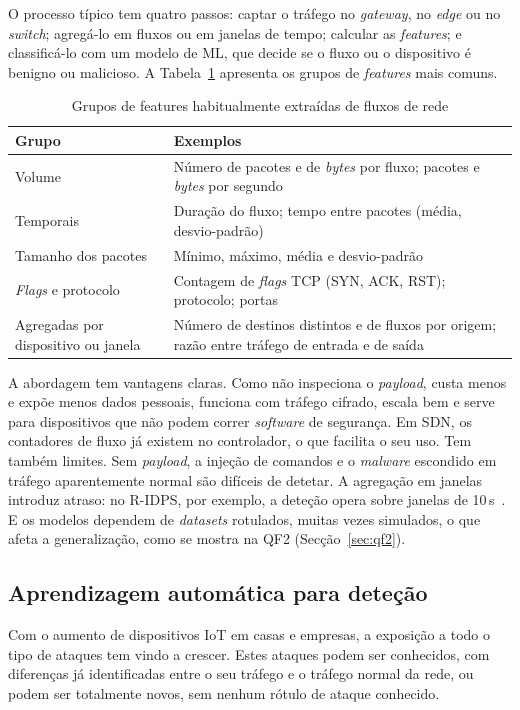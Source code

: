 \documentclass[conference,a4paper]{IEEEtran}
\begin{document}
O processo típico tem quatro passos: captar o tráfego no \textit{gateway}, no
\textit{edge} ou no \textit{switch}; agregá-lo em fluxos ou em janelas de tempo; calcular
as \textit{features}; e classificá-lo com um modelo de ML, que decide se o fluxo ou o
dispositivo é benigno ou malicioso. A Tabela~\ref{tab:features} apresenta os grupos de
\textit{features} mais comuns.

\begin{table}[H]
\caption{Grupos de features habitualmente extraídas de fluxos de rede}\label{tab:features}
\centering\scriptsize
\begin{tabular}{@{}>{\raggedright\arraybackslash}p{}>{\raggedright\arraybackslash}p{}@{}}
\toprule
Grupo & Exemplos \\
\midrule
Volume & Número de pacotes e de \textit{bytes} por fluxo; pacotes e \textit{bytes} por segundo \\
Temporais & Duração do fluxo; tempo entre pacotes (média, desvio-padrão) \\
Tamanho dos pacotes & Mínimo, máximo, média e desvio-padrão \\
\textit{Flags} e protocolo & Contagem de \textit{flags} TCP (SYN, ACK, RST); protocolo; portas \\
Agregadas por dispositivo ou janela & Número de destinos distintos e de fluxos por origem; razão entre tráfego de entrada e de saída \\
\bottomrule
\end{tabular}
\end{table}

A abordagem tem vantagens claras. Como não inspeciona o \textit{payload}, custa menos e
expõe menos dados pessoais, funciona com tráfego cifrado, escala bem e serve para
dispositivos que não podem correr \textit{software} de segurança. Em SDN, os contadores de
fluxo já existem no controlador, o que facilita o seu uso. Tem também limites. Sem
\textit{payload}, a injeção de comandos e o \textit{malware} escondido em tráfego
aparentemente normal são difíceis de detetar. A agregação em janelas introduz atraso: no
R-IDPS, por exemplo, a deteção opera sobre janelas de 10\,s~\cite{mazhar2022ridps}. E os
modelos dependem de \textit{datasets} rotulados, muitas vezes simulados, o que afeta a
generalização, como se mostra na QF2 (Secção~\ref{sec:qf2}).

\subsection{Aprendizagem automática para deteção}
Com o aumento de dispositivos IoT em casas e empresas, a exposição a todo o tipo de
ataques tem vindo a crescer. Estes ataques podem ser conhecidos, com diferenças já
identificadas entre o seu tráfego e o tráfego normal da rede, ou podem ser totalmente
novos, sem nenhum rótulo de ataque conhecido.
\end{document}
